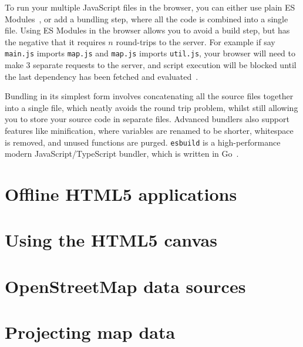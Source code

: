 \documentclass{final_report}
\begin{document}
To run your multiple JavaScript files in the browser, you can either use plain ES Modules~\cite{mdn-es-modules}, or add a bundling step, where all the code is combined into a single file. Using ES Modules in the browser allows you to avoid a build step, but has the negative that it requires \(n\) round-trips to the server. For example if say \texttt{main.js} imports \texttt{map.js} and \texttt{map.js} imports \texttt{util.js}, your browser will need to make 3 separate requests to the server, and script execution will be blocked until the last dependency has been fetched and evaluated~\cite{sitepoint-using-es-modules}. 

Bundling in its simplest form involves concatenating all the source files together into a single file, which neatly avoids the round trip problem, whilst still allowing you to store your source code in separate files. Advanced bundlers also support features like minification, where variables are renamed to be shorter, whitespace is removed, and unused functions are purged. \texttt{esbuild} is a high-performance modern JavaScript/TypeScript bundler, which is written in Go~\cite{esbuild}.

\section{Offline HTML5 applications}\label{sec:offline-html-applications}



\section{Using the HTML5 canvas}



\section{OpenStreetMap data sources}\label{sec:osm-data-sources}



\section{Projecting map data}\label{sec:projecting-map-data}


\end{document}
